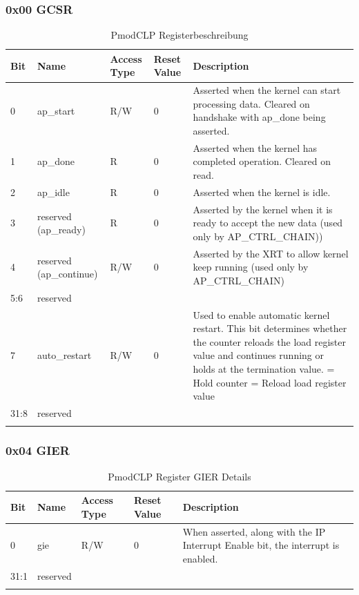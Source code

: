 \subsubsection*{0x00 GCSR}
\begin{longtable}{|p{1.5cm}|p{3cm}|p{2cm}|p{2cm}|p{5cm}|}
\hline
\textbf{Bit} & \textbf{Name} & \textbf{Access Type} & \textbf{Reset Value} & \textbf{Description} \\
\hline
0 & ap\_start & R/W & 0 & Asserted when the kernel can start processing data. Cleared on handshake with ap\_done being asserted. \\
\hline
1 & ap\_done & R & 0 & Asserted when the kernel has completed operation. Cleared on read. \\
\hline
2 & ap\_idle & R & 0 & Asserted when the kernel is idle. \\
\hline
3 & reserved (ap\_ready) & R & 0 & Asserted by the kernel when it is ready to accept the new data (used only by AP\_CTRL\_CHAIN)) \\
\hline
4 & reserved (ap\_continue) & R/W & 0 & Asserted by the XRT to allow kernel keep running (used only by AP\_CTRL\_CHAIN) \\
\hline
5:6 & reserved & & & \\
\hline
7 & auto\_restart & R/W & 0 & Used to enable automatic kernel restart. This bit determines whether the counter reloads the load register value and continues running or holds at the termination value.
\newline 0 = Hold counter
\newline 1 = Reload load register value \\
\hline
31:8 & reserved & & & \\
\hline
\caption{PmodCLP Registerbeschreibung}
\end{longtable}

\subsubsection*{0x04 GIER}
\begin{longtable}{|p{1.5cm}|p{3cm}|p{2cm}|p{2cm}|p{5cm}|}
\hline
\textbf{Bit} & \textbf{Name} & \textbf{Access Type} & \textbf{Reset Value} & \textbf{Description} \\
\hline
0 & gie & R/W & 0 & When asserted, along with the IP Interrupt Enable bit, the interrupt is enabled. \\
\hline
31:1 & reserved & & & \\
\hline
\caption{PmodCLP Register GIER Details}
\end{longtable}

